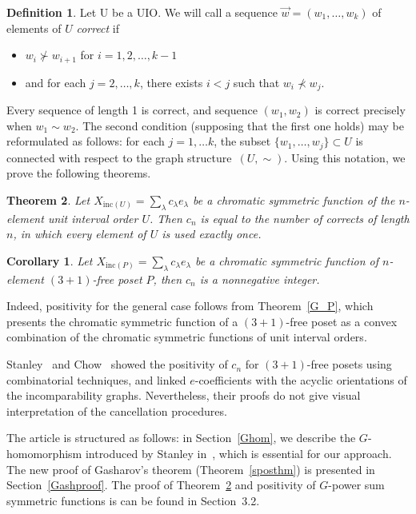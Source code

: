 \documentclass{article}
\theoremstyle{plain}
\newtheorem{thm}{Theorem}[section]
\newtheorem{cor}{Corollary}[thm]
\theoremstyle{definition}
\newtheorem{defn}[thm]{Definition}
\newcommand{\vs}{\vec w}
\begin{document}
\begin{defn}
Let U be a UIO.  We will call a sequence $\vs = (w_1,\dots, w_k)$ of elements of $U$ {\em
   correct} if
 \begin{itemize}
 \item 
$w_i\not\succ w_{i+1}$ for $i=1,2,\dots,k-1$ 
\item and for
 each $j=2,\dots,k$, there exists $i<j$ such that $w_i\not\prec w_j$.
 \end{itemize}
\end{defn}
Every sequence of length 1 is correct, and sequence $(w_1,w_2)$ is
correct precisely when $w_1\sim w_2$. The second condition (supposing that the first one holds) may be reformulated as follows:
for each $j=1,\dots k$, the subset $\{w_1,\dots,w_j\}\subset U$ is connected
with respect to the graph structure~${(U,\sim)}$.
Using this notation, we prove the following theorems.
\begin{thm}\label{eposn} 
Let $X_{\text{inc}(U)}=\sum\limits_{\lambda}c_\lambda e_\lambda$ be a chromatic symmetric function of the $n$-element unit interval order $U$. Then $c_n$ is equal to the number of corrects of length $n$, in which every element of $U$ is used exactly once.
\end{thm}
\begin{cor}
Let $X_{\text{inc}(P)}=\sum\limits_{\lambda}c_\lambda e_\lambda$ be a chromatic symmetric function of  $n$-element $(3+1)$-free poset $P$, then $c_n$ is a nonnegative integer.
\end{cor}
Indeed, positivity for the general case follows from Theorem~\ref{G_P}, which presents the chromatic symmetric function of a $(3+1)$-free poset as a convex combination of the chromatic symmetric functions of unit interval orders.

Stanley~\cite{Stanley95b} and Chow~\cite{Chow95} showed the positivity of $c_n$ for $(3+1)$-free posets using combinatorial techniques, and linked $e$-coefficients with the acyclic orientations of the incomparability graphs. Nevertheless, their proofs do not give visual interpretation of the cancellation procedures. 



The article is structured as follows: in Section~\ref{Ghom}, we describe
the $G$-homomorphism introduced by Stanley in~\cite{Stanley95b}, which
is essential for our approach. The new proof of Gasharov's theorem (Theorem~\ref{sposthm}) is presented
in Section~\ref{Gashproof}. The proof of Theorem~\ref{eposn} and positivity of $G$-power sum symmetric functions is can be found in Section~3.2.
\end{document}
